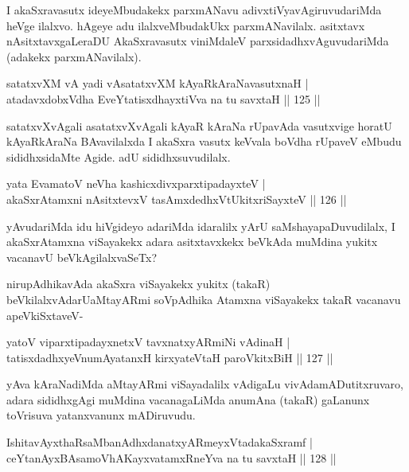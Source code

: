 \begin{artha}
I akaSxravasutx ideyeMbudakekx parxmANavu adivxtiVyavAgiruvudariMda heVge ilalxvo. hAgeye adu ilalxveMbudakUkx parxmANavilalx. asitxtavx nAsitxtavxgaLeraDU AkaSxravasutx viniMdaleV parxsidadhxvAguvudariMda (adakekx parxmANavilalx).
\end{artha}

\begin{shl}
satatxvXM vA yadi vA\s satatxvXM kAyaRkAraNavasutxnaH |\\
atadavxdobxVdha EveYtatisxdhayxtiVva na tu savxtaH \hfill || 125 ||
\end{shl}

\begin{artha}%
satatxvXvAgali asatatxvXvAgali kAyaR kAraNa rUpavAda vasutxvige horatU kAyaRkAraNa BAvavilalxda I akaSxra vasutx keVvala boVdha rUpaveV eMbudu sididhxsidaMte Agide. adU sididhxsuvudilalx.
\end{artha}


\begin{shl}
yata EvamatoV neVha kashicxdivxparxtipadayxteV |\\
akaSxrAtamxni nAsitxtevxV tasAmxdedhxVtUkitxriSayxteV \hfill || 126 ||
\end{shl}

\begin{artha}
yAvudariMda idu hiVgideyo adariMda idaralilx yArU saMshayapaDuvudilalx, I akaSxrAtamxna viSayakekx adara asitxtavxkekx beVkAda muMdina yukitx vacanavU beVkAgilalxvaSeTx?

nirupAdhikavAda akaSxra viSayakekx yukitx (takaR) beVkilalxvAdarU\break aMtayARmi soVpAdhika Atamxna viSayakekx takaR vacanavu apeVkiSxtaveV-
\end{artha}

\begin{shl}
yatoV viparxtipadayxnetxV tavxnatxyARmiNi vAdinaH |\\
tatisxdadhxyeV\s numAyatanxH kirxyateV\s taH paroVkitxBiH \hfill || 127 ||
\end{shl}

\begin{artha}
yAva kAraNadiMda aMtayARmi viSayadalilx vAdigaLu vivAda\break mADutitxruvaro, adara sididhxgAgi muMdina vacanagaLiMda anumAna (takaR) gaLanunx toVrisuva yatanxvanunx mADiruvudu.
\end{artha}

\begin{shl}
IshitavAyxthaRsaMbanAdhxdanatxyARmeyxVtadakaSxramf |\\
ceYtanAyxBAsamoVhAKayxvatamxRneYva na tu savxtaH \hfill || 128 ||
\end{shl}

